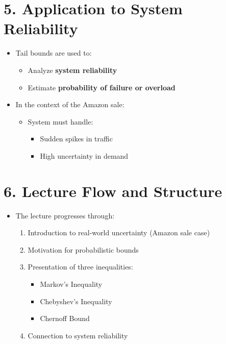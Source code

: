 \documentclass[12pt]{article}
\begin{document}
\section*{5. Application to System Reliability}

\begin{itemize}
    \item Tail bounds are used to:
    \begin{itemize}
        \item Analyze \textbf{system reliability}
        \item Estimate \textbf{probability of failure or overload}
    \end{itemize}
    \item In the context of the Amazon sale:
    \begin{itemize}
        \item System must handle:
        \begin{itemize}
            \item Sudden spikes in traffic  
            \item High uncertainty in demand  
        \end{itemize}
    \end{itemize}
\end{itemize}

\section*{6. Lecture Flow and Structure}

\begin{itemize}
    \item The lecture progresses through:
    \begin{enumerate}
        \item Introduction to real-world uncertainty (Amazon sale case)
        \item Motivation for probabilistic bounds  
        \item Presentation of three inequalities:
        \begin{itemize}
            \item Markov’s Inequality  
            \item Chebyshev’s Inequality  
            \item Chernoff Bound  
        \end{itemize}
        \item Connection to system reliability  
    \end{enumerate}
\end{itemize}
\end{document}
